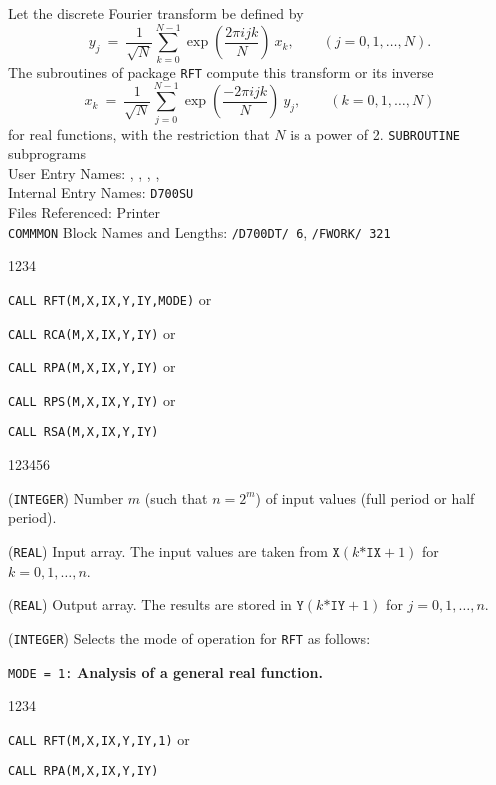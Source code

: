                             
                       
\Submitter{}                              
                        
Let the discrete Fourier transform be defined by
$$ y_j \ = \
\frac{1}{\sqrt{N}}\sum^{N-1}_{k=0}\exp\left(\frac{2\pi ijk}{N}\right) \
x_k, \qquad (j=0,1,\ldots,N). $$
The subroutines of package {\tt RFT} compute this transform or its
inverse
$$ x_k \ = \
\frac{1}{\sqrt{N}}\sum^{N-1}_{j=0}\exp\left(\frac{-2\pi ijk}{N}\right) \
y_j, \qquad (k=0,1,\ldots,N) $$
for real functions, with the restriction that $N$ is a power of 2.
\Structure
{\tt SUBROUTINE} subprograms \\
User Entry Names: \Rdef{RFT}, , , ,
\Rdef{RSA}\\
Internal Entry Names: {\tt D700SU}\\
Files Referenced: Printer  \\
{\tt COMMMON} Block Names and Lengths:
{\tt /D700DT/ 6}, {\tt /FWORK/ 321}
\Usage
\begin{DLtt}{1234}
\item[] {\tt CALL RFT(M,X,IX,Y,IY,MODE)} \qquad or
\item[] {\tt CALL RCA(M,X,IX,Y,IY)} \qquad or
\item[] {\tt CALL RPA(M,X,IX,Y,IY)} \qquad or
\item[] {\tt CALL RPS(M,X,IX,Y,IY)} \qquad or
\item[] {\tt CALL RSA(M,X,IX,Y,IY)}
\end{DLtt}
\begin{DLtt}{123456}
\item[M] ({\tt INTEGER}) Number $m$ (such that $n=2^m$) of
input values (full period or half period).
\item[X] ({\tt REAL}) Input array. The input values are taken from
$\mathtt{X}(k\mathtt{*IX}+1)$ for $k=0,1,\ldots,n$.
\item[Y] ({\tt REAL}) Output array. The results are stored in
$\mathtt{Y}(k\mathtt{*IY}+1)$ for $j=0,1,\ldots,n$.
\item [MODE] ({\tt INTEGER}) Selects the mode of operation for {\tt RFT}
as follows:
\end{DLtt}
{\tt MODE = 1:} {\bf Analysis of a  general real function.}
\begin{DLtt}{1234}
\item[] {\tt CALL RFT(M,X,IX,Y,IY,1)} \qquad or
\item[] {\tt CALL RPA(M,X,IX,Y,IY)}
\end{DLtt}
